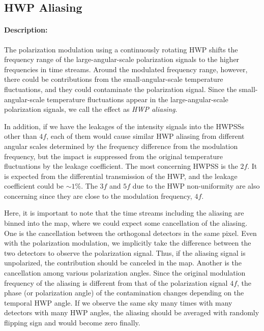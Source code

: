 \subsection{HWP Aliasing}

\paragraph{Description:}


The polarization modulation using a continuously rotating HWP shifts the frequency range of the large-angular-scale polarization signals to the higher frequencies in time streams. 
Around the modulated frequency range, however, there could be contributions from the small-angular-scale temperature fluctuations, and they could contaminate the polarization signal.
Since the small-angular-scale temperature fluctuations appear in the large-angular-scale polarization signals,
we call the effect as \emph{HWP aliasing}.

In addition, if we have the leakages of the intensity signals into the HWPSSs other than $4f$,
each of them would cause similar HWP aliasing from different angular scales determined by the frequency difference from the modulation frequency, but the impact is suppressed from the original temperature fluctuations by the leakage coefficient.
The most concerning HWPSS is the $2f$. It is expected from the differential transmission of the HWP, and the leakage coefficient could be $\sim 1\%$.
The $3f$ and $5f$ due to the HWP non-uniformity are also concerning since they are close to the modulation frequency, $4f$.

Here, it is important to note that the time streams including the aliasing are binned into the map,
where we could expect some cancellation of the aliasing.
One is the cancellation between the orthogonal detectors in the same pixel.
Even with the polarization modulation, we implicitly take the difference between the two detectors to observe the polarization signal.
Thus, if the aliasing signal is unpolarized, the contribution should be canceled in the map.
Another is the cancellation among various polarization angles.
Since the original modulation frequency of the aliasing is different from that of the polarization signal $4f$, the phase (or polarization angle) of the contamination changes depending on the temporal HWP angle.
If we observe the same sky many times with many detectors with many HWP angles, the aliasing should be averaged with randomly flipping sign and would become zero finally.



